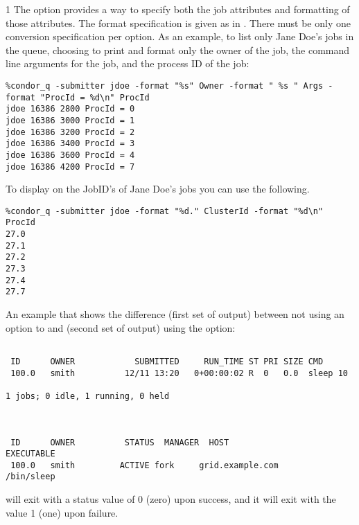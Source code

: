 \begin{ManPage}{\label{man-condor-q}}{1}
The  option provides a way to specify both the job attributes
and formatting of those attributes.
The format specification is given as in .
There must be only one conversion specification per  option.
As an example, to list only Jane Doe's jobs in the queue,
choosing to print and format only the owner of the job,
the command line arguments for the job, and the
process ID of the job:
\begin{verbatim}
%condor_q -submitter jdoe -format "%s" Owner -format " %s " Args -format "ProcId = %d\n" ProcId
jdoe 16386 2800 ProcId = 0
jdoe 16386 3000 ProcId = 1
jdoe 16386 3200 ProcId = 2
jdoe 16386 3400 ProcId = 3
jdoe 16386 3600 ProcId = 4
jdoe 16386 4200 ProcId = 7
\end{verbatim}

To display on the JobID's of Jane Doe's jobs you can use the following.
\begin{verbatim}
%condor_q -submitter jdoe -format "%d." ClusterId -format "%d\n" ProcId
27.0
27.1
27.2
27.3
27.4
27.7
\end{verbatim}

An example that shows the difference (first set of output)
between not using an option to  and (second
set of output) using the  option:
\begin{verbatim}

 ID      OWNER            SUBMITTED     RUN_TIME ST PRI SIZE CMD
 100.0   smith          12/11 13:20   0+00:00:02 R  0   0.0  sleep 10

1 jobs; 0 idle, 1 running, 0 held



 ID      OWNER          STATUS  MANAGER  HOST                EXECUTABLE
 100.0   smith         ACTIVE fork     grid.example.com       /bin/sleep
\end{verbatim}

\ExitStatus

 will exit with a status value of 0 (zero) upon success,
and it will exit with the value 1 (one) upon failure.

\end{ManPage}
